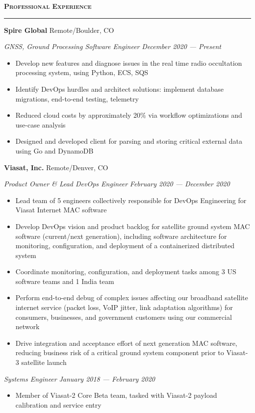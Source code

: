 \documentclass[10pt,letterpaper,hidelinks]{article}
\newcommand*{\seriffont}{\fontfamily{yv1}\selectfont}
\newenvironment{resumeSection}[1]{
{\Large \textbf{\textsc{#1}}}
\vspace{0.25em}
\hrule
\vspace{0.5em}
}{

}
\newenvironment{employer}[2]{
{\large \textbf{#1} \hfill #2} \newline
}{
\vspace{0.5em}
}
\newenvironment{position}[2]{
{\large \emph{#1} \hfill \emph{#2}}
\seriffont 
\begin{itemize}[noitemsep,topsep=0pt]
}{
\end{itemize}
\vspace{0.5em}
}
\begin{document}
\begin{resumeSection}{Professional Experience}
\begin{employer}{Spire Global}{Remote/Boulder, CO}
\begin{position}{GNSS, Ground Processing Software Engineer}{December 2020 --- Present}
\item Develop new features and diagnose issues in the real time radio occultation processing system, using Python, ECS, SQS
\item Identify DevOps hurdles and architect solutions: implement database migrations, end-to-end testing, telemetry
\item Reduced cloud costs by approximately 20\% via workflow optimizations and use-case analysis
\item Designed and developed client for parsing and storing critical external data using Go and DynamoDB
\end {position}
\end{employer}
\begin{employer}{Viasat, Inc.}{Remote/Denver, CO}
\begin{position}{Product Owner \& Lead DevOps Engineer}{February 2020 --- December 2020}
\item Lead team of 5 engineers collectively responsible for DevOps Engineering for Viasat Internet MAC software
\item Develop DevOps vision and product backlog for satellite ground system MAC software (current/next generation), including software architecture for monitoring, configuration, and deployment of a containerized distributed system
\item Coordinate monitoring, configuration, and deployment tasks among 3 US software teams and 1 India team
\item Perform end-to-end debug of complex issues affecting our broadband satellite internet service (packet loss, VoIP jitter, link adaptation algorithms) for consumers, businesses, and government customers using our commercial network
\item Drive integration and acceptance effort of next generation MAC software, reducing business risk of a critical ground system component prior to Viasat-3 satellite launch
\end {position}
\begin{position}{Systems Engineer}{January 2018 --- February 2020}
\item Member of Viasat-2 Core Beta team, tasked with Viasat-2 payload calibration and service entry

\end{position}
\end{employer}
\end{resumeSection}
\end{document}
